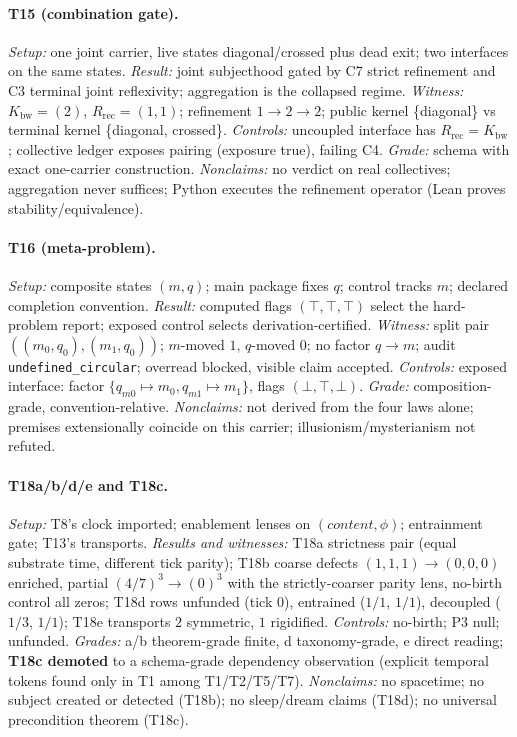 \documentclass[11pt]{article}
\newcommand{\Kbw}{K_{\mathrm{bw}}}
\newcommand{\Rrec}{R_{\mathrm{rec}}}
\theoremstyle{definition}
\begin{document}
\paragraph{T15 (combination gate).}
\emph{Setup:} one joint carrier, live states diagonal/crossed plus dead
exit; two interfaces on the same states. \emph{Result:} joint subjecthood
gated by C7 strict refinement and C3 terminal joint reflexivity; aggregation
is the collapsed regime. \emph{Witness:} $\Kbw = (2)$, $\Rrec = (1,1)$;
refinement $1 \to 2 \to 2$; public kernel \{diagonal\} vs terminal kernel
\{diagonal, crossed\}. \emph{Controls:} uncoupled interface has $\Rrec =
\Kbw$; collective ledger exposes pairing (exposure true), failing C4.
\emph{Grade:} schema with exact one-carrier construction. \emph{Nonclaims:}
no verdict on real collectives; aggregation never suffices; Python executes
the refinement operator (Lean proves stability/equivalence).

\paragraph{T16 (meta-problem).}
\emph{Setup:} composite states $(m, q)$; main package fixes $q$; control
tracks $m$; declared completion convention. \emph{Result:} computed flags
$(\top,\top,\top)$ select the hard-problem report; exposed control selects
derivation-certified. \emph{Witness:} split pair $((m_0,q_0),(m_1,q_0))$;
$m$-moved $1$, $q$-moved $0$; no factor $q \to m$; audit
\texttt{undefined\_circular}; overread blocked, visible claim accepted.
\emph{Controls:} exposed interface: factor $\{q_{m0} \mapsto m_0, q_{m1}
\mapsto m_1\}$, flags $(\bot,\top,\bot)$. \emph{Grade:} composition-grade,
convention-relative. \emph{Nonclaims:} not derived from the four laws alone;
premises extensionally coincide on this carrier; illusionism/mysterianism
not refuted.

\paragraph{T18a/b/d/e and T18c.}
\emph{Setup:} T8's clock imported; enablement lenses on $(content, \phi)$;
entrainment gate; T13's transports. \emph{Results and witnesses:} T18a
strictness pair (equal substrate time, different tick parity); T18b coarse
defects $(1,1,1) \to (0,0,0)$ enriched, partial $(4/7)^3 \to (0)^3$ with the
strictly-coarser parity lens, no-birth control all zeros; T18d rows unfunded
(tick $0$), entrained ($1/1$, $1/1$), decoupled ($1/3$, $1/1$); T18e
transports $2$ symmetric, $1$ rigidified. \emph{Controls:} no-birth; P3
null; unfunded. \emph{Grades:} a/b theorem-grade finite, d taxonomy-grade,
e direct reading; \textbf{T18c demoted} to a schema-grade dependency
observation (explicit temporal tokens found only in T1 among T1/T2/T5/T7).
\emph{Nonclaims:} no spacetime; no subject created or detected (T18b); no
sleep/dream claims (T18d); no universal precondition theorem (T18c).
\end{document}
